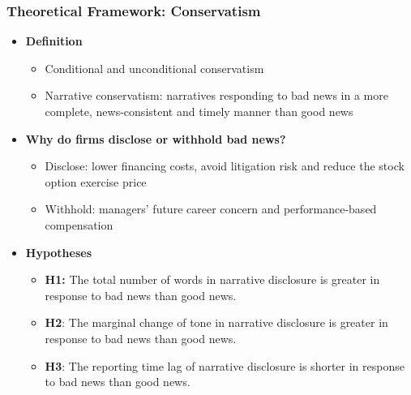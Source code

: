 \documentclass{beamer}
\begin{document}
\begin{frame}
\frametitle{Theoretical Framework: Conservatism}
\begin{itemize}
		
\item \textbf{Definition}

	\begin{itemize}
		\item Conditional and unconditional conservatism
		\item Narrative conservatism: narratives responding to bad news in a more complete, news-consistent and timely manner than good news
	\end{itemize}

\item \textbf{Why do firms disclose or withhold bad news?}

\begin{itemize}
	\item Disclose: lower financing costs, avoid litigation risk and reduce the stock option exercise price
	\item Withhold: managers' future career concern and performance-based compensation
\end{itemize}

\item \textbf{Hypotheses}

\begin{itemize}
	\item  \textbf{H1:} The total number of words in narrative disclosure is greater in response to bad news than good news.
	\item  \textbf{H2}: The marginal change of tone in narrative disclosure is greater in response to bad news than good news.
	\item  \textbf{H3}: The reporting time lag of narrative disclosure is shorter in response to bad news than good news.
\end{itemize}

\end{itemize}
\end{frame}
\end{document}
